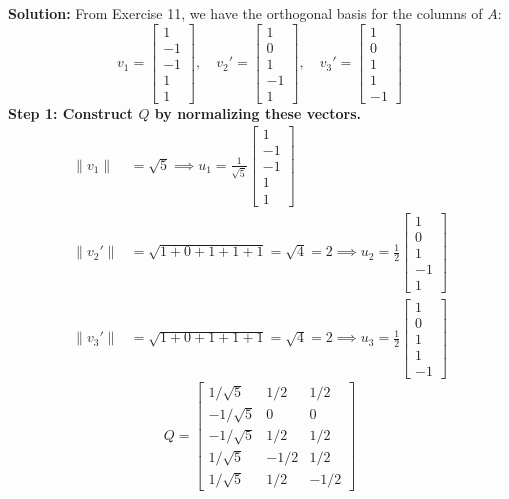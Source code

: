 \documentclass[11pt, letterpaper]{article}
\theoremstyle{definition}
\theoremstyle{remark}
\begin{document}
\textbf{Solution:}
From Exercise 11, we have the orthogonal basis for the columns of $A$:
\[ v_1 = \begin{bmatrix} 1 \\ -1 \\ -1 \\ 1 \\ 1 \end{bmatrix}, \quad v_2' = \begin{bmatrix} 1 \\ 0 \\ 1 \\ -1 \\ 1 \end{bmatrix}, \quad v_3' = \begin{bmatrix} 1 \\ 0 \\ 1 \\ 1 \\ -1 \end{bmatrix} \]
\textbf{Step 1: Construct $Q$ by normalizing these vectors.}
\begin{align*}
    \|v_1\| &= \sqrt{5} \implies u_1 = \frac{1}{\sqrt{5}} \begin{bmatrix} 1 \\ -1 \\ -1 \\ 1 \\ 1 \end{bmatrix} \\
    \|v_2'\| &= \sqrt{1+0+1+1+1} = \sqrt{4} = 2 \implies u_2 = \frac{1}{2} \begin{bmatrix} 1 \\ 0 \\ 1 \\ -1 \\ 1 \end{bmatrix} \\
    \|v_3'\| &= \sqrt{1+0+1+1+1} = \sqrt{4} = 2 \implies u_3 = \frac{1}{2} \begin{bmatrix} 1 \\ 0 \\ 1 \\ 1 \\ -1 \end{bmatrix}
\end{align*}
\[ Q = \begin{bmatrix} 1/\sqrt{5} & 1/2 & 1/2 \\ -1/\sqrt{5} & 0 & 0 \\ -1/\sqrt{5} & 1/2 & 1/2 \\ 1/\sqrt{5} & -1/2 & 1/2 \\ 1/\sqrt{5} & 1/2 & -1/2 \end{bmatrix} \]
\end{document}
